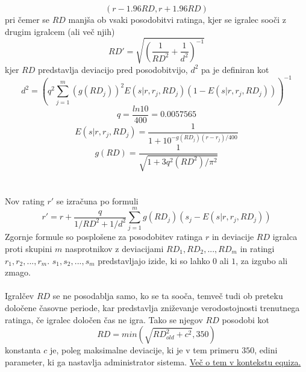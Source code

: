 \documentclass{IEEEtran}
\begin{document}
\begin{equation}
    \left ( r -1.96RD, r +1.96RD \right )
\end{equation}
pri čemer se $RD$ manjša ob vsaki posodobitvi ratinga, kjer se igralec sooči z drugim igralcem (ali več njih)
\begin{equation}
    RD'=\sqrt{\left (  \frac{1}{RD^{2}} + \frac{1}{d^{2}}\right )^{-1}}
\end{equation}
kjer $RD$ predstavlja deviacijo pred posodobitvijo, $d^{2}$ pa je definiran kot
\begin{equation}
    d^{2}=\left ( q^{2} \sum_{j=1}^{m} \left (g\left( RD_{j} \right ) \right )^{2}E\left ( s|r, r_{j}, RD_{j} \right )\left (1-E\left ( s|r, r_{j}, RD_{j} \right ) \right )\right )^{-1} 
\end{equation}
\begin{equation}
    q=\frac{ln10}{400}=0.0057565
\end{equation}
\begin{equation}
    E\left ( s|r, r_{j}, RD_{j} \right )=\frac{1}{1+10^{-g\left ( RD_{j} \right )\left ( r-r_{j} \right )/400}}
\end{equation}
\begin{equation}
g\left ( RD \right )=\frac{1}{\sqrt{1+3q^{2}\left ( RD^{2} \right )/\pi^{2} }}
\end{equation}
\hfill
\\
\\
Nov rating $r'$ se izračuna po formuli
\begin{equation}
    r'=r+\frac{q}{1/RD^{2}+1/d^{2}}\sum_{j=1}^{m}g\left( RD_{j} \right )\left (s_{j}-E\left ( s|r, r_{j}, RD_{j} \right ) \right )
\end{equation}
Zgornje formule so posplošene za posodobitev ratinga $r$ in deviacije $RD$ igralca proti skupini $m$ nasprotnikov z deviacijami 
$RD_{1}, RD_{2}, ..., RD_{m}$ in ratingi $r_{1}, r_{2}, ..., r_{m}$. $s_{1}, s_{2}, ..., s_{m}$ predstavljajo izide, ki so lahko $0$ ali $1$, za izgubo ali zmago.
\hfill
\\
\\
Igralčev $RD$ se ne posodablja samo, ko se ta sooča, temveč tudi ob preteku določene časovne periode, kar predstavlja zniževanje verodostojnosti trenutnega ratinga, če igralec določen čas ne igra.
Tako se njegov $RD$ posodobi kot
\begin{equation}
    RD = min\left(\sqrt{RD_{old}^{2} + c^{2}}, 350\right)
\end{equation}
konstanta $c$ je, poleg maksimalne deviacije, ki je v tem primeru $350$, edini parameter, ki ga nastavlja administrator sistema. \hyperref[sec:izracun]{Več o tem v kontekstu equiza.} %
\end{document}
